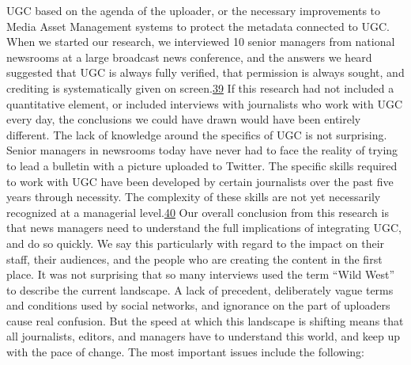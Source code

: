 \documentclass[symmetric, notoc, nobib]{towcenter-book}
\begin{document}
UGC based on the agenda of the uploader, or the necessary improvements
to Media Asset Management systems to protect the metadata connected
to UGC.
When we started our research, we interviewed 10 senior managers from
national newsrooms at a large broadcast news conference, and the answers
we heard suggested that UGC is always fully verified, that permission is
always sought, and crediting is systematically given on screen.{\href{#endnotes}{39}} If this
research had not included a quantitative element, or included interviews
with journalists who work with UGC every day, the conclusions we could
have drawn would have been entirely different. The lack of knowledge
around the specifics of UGC is not surprising. Senior managers in newsrooms
today have never had to face the reality of trying to lead a bulletin
with a picture uploaded to Twitter. The specific skills required to work with
UGC have been developed by certain journalists over the past five years
through necessity. The complexity of these skills are not yet necessarily recognized
at a managerial level.{\href{#endnotes}{40}}
Our overall conclusion from this research is that news managers need to
understand the full implications of integrating UGC, and do so quickly. We
say this particularly with regard to the impact on their staff, their audiences,
and the people who are creating the content in the first place.
It was not surprising that so many interviews used the term ``Wild West''
to describe the current landscape. A lack of precedent, deliberately vague
terms and conditions used by social networks, and ignorance on the part
of uploaders cause real confusion. But the speed at which this landscape
is shifting means that all journalists, editors, and managers have to understand
this world, and keep up with the pace of change. The most important
issues include the following:
\end{document}
